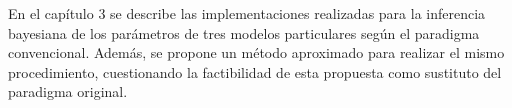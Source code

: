En el capítulo 3 se describe las implementaciones realizadas para la inferencia bayesiana de los parámetros de tres modelos particulares según el paradigma convencional. Además, se propone un método aproximado para realizar el mismo procedimiento, cuestionando la factibilidad de esta propuesta como sustituto del paradigma original.


































